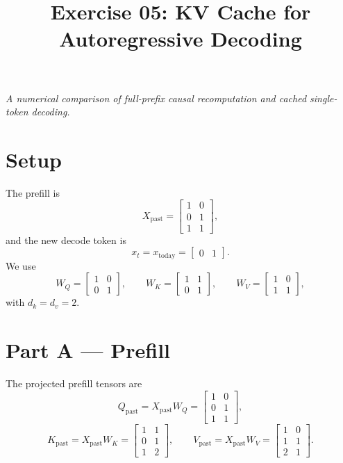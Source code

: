 \documentclass[11pt]{article}
\title{\textbf{Exercise 05: KV Cache for Autoregressive Decoding}}
\author{}
\date{}
\begin{document}
\maketitle

\begin{center}
\emph{A numerical comparison of full-prefix causal recomputation and cached single-token decoding.}
\end{center}

\section*{Setup}

The prefill is
\[
X_{\mathrm{past}}=
\begin{bmatrix}
1&0\\
0&1\\
1&1
\end{bmatrix},
\]
and the new decode token is
\[
x_t=x_{\mathrm{today}}=\begin{bmatrix}0&1\end{bmatrix}.
\]
We use
\[
W_Q=\begin{bmatrix}1&0\\0&1\end{bmatrix},\qquad
W_K=\begin{bmatrix}1&1\\0&1\end{bmatrix},\qquad
W_V=\begin{bmatrix}1&0\\1&1\end{bmatrix},
\]
with $d_k=d_v=2$.

\section*{Part A --- Prefill}

The projected prefill tensors are
\[
Q_{\mathrm{past}}=X_{\mathrm{past}}W_Q=
\begin{bmatrix}
1&0\\0&1\\1&1
\end{bmatrix},
\]
\[
K_{\mathrm{past}}=X_{\mathrm{past}}W_K=
\begin{bmatrix}
1&1\\0&1\\1&2
\end{bmatrix},
\qquad
V_{\mathrm{past}}=X_{\mathrm{past}}W_V=
\begin{bmatrix}
1&0\\1&1\\2&1
\end{bmatrix}.
\]
\end{document}
